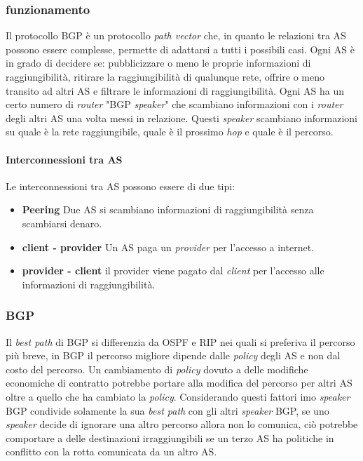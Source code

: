         \subsubsection{funzionamento}
            Il protocollo \Acrshort*{BGP} è un protocollo \textit{path vector} che, in quanto le relazioni tra \Acrshort*{AS} possono essere complesse, permette di adattarsi a tutti i possibili casi. Ogni \Acrshort*{AS} è in grado di decidere se: pubblicizzare o meno le proprie informazioni di raggiungibilità, ritirare la raggiungibilità di qualunque rete, offrire o meno transito ad altri \Acrshort*{AS} e filtrare le informazioni di raggiungibilità.\newline
            Ogni \Acrshort*{AS} ha un certo numero di \textit{router} "\Acrshort*{BGP} \textit{speaker}" che scambiano informazioni con i \textit{router} degli altri \Acrshort*{AS} una volta messi in relazione. Questi \textit{speaker} scambiano informazioni su quale è la rete raggiungibile, quale è il prossimo \textit{hop} e quale è il percorso.
            \paragraph{Interconnessioni tra \Acrshort*{AS}} Le interconnessioni tra \Acrshort*{AS} possono essere di due tipi: \begin{itemize}
                \item \textbf{Peering} Due \Acrshort*{AS} si scambiano informazioni di raggiungibilità senza scambiarsi denaro.
                \item \textbf{client - provider} Un \Acrshort*{AS} paga un \textit{provider} per l'accesso a internet.
                \item \textbf{provider - client} il provider viene pagato dal \textit{client} per l'accesso alle informazioni di raggiungibilità.
            \end{itemize}
        \subsubsection{\acrfull*{BGP}}
            Il \textit{best path} di \Acrshort*{BGP} si differenzia da \Acrshort*{OSPF} e \Acrshort*{RIP} nei quali si preferiva il percorso più breve, in \Acrshort*{BGP} il percorso migliore dipende dalle \textit{policy} degli \Acrshort*{AS} e non dal costo del percorso. Un cambiamento di \textit{policy} dovuto a delle modifiche economiche di contratto potrebbe portare alla modifica del percorso per altri \Acrshort*{AS} oltre a quello che ha cambiato la \textit{policy}.\newline
            Considerando questi fattori imo \textit{speaker} \Acrshort*{BGP} condivide solamente la sua \textit{best path} con gli altri \textit{speaker} \Acrshort*{BGP}, se uno \textit{speaker} decide di ignorare una altro percorso allora non lo comunica, ciò potrebbe comportare a delle destinazioni irraggiungibili se un terzo \Acrshort*{AS} ha politiche in conflitto con la rotta comunicata da un altro \Acrshort*{AS}.
            
